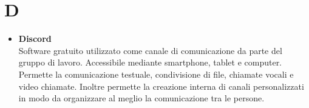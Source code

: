 \chapter{D} \label{D}
	\begin{itemize}
		\item \textbf{Discord}\\
		Software gratuito utilizzato come canale di comunicazione da parte del gruppo di lavoro.
		Accessibile mediante smartphone, tablet e computer.
		Permette la comunicazione testuale, condivisione di file, chiamate vocali e video chiamate.
		Inoltre permette la creazione interna di canali personalizzati in modo da organizzare al meglio la comunicazione tra le persone.
	\end{itemize}